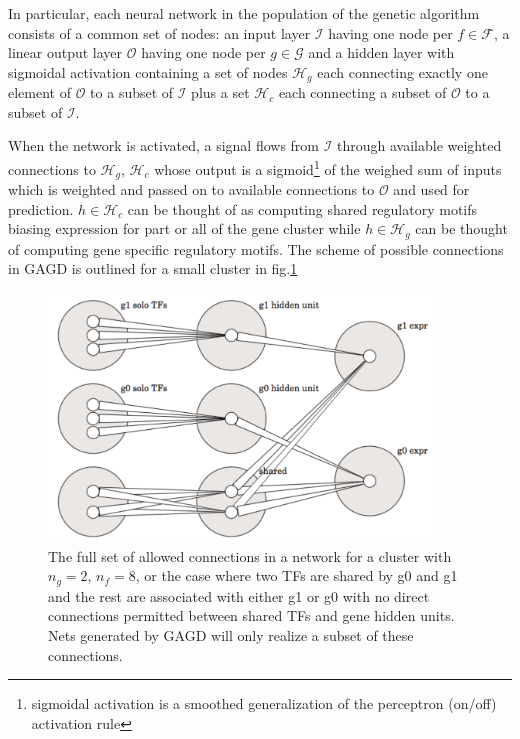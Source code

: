 \documentclass[12pt,a4paper]{article}
\begin{document}
\begin{multicols}{2}
In particular, each neural network in the population of the genetic algorithm  consists of a common set of nodes: an input layer $\mathcal{I}$ having one node per $f \in \mathcal{F}$, a linear output layer $\mathcal{O}$ having one node per $g \in \mathcal{G}$ and a hidden layer with sigmoidal activation containing a set of nodes $\mathcal{H}_g$ each connecting exactly one element of $\mathcal{O}$ to a subset of $\mathcal{I}$ plus a set $\mathcal{H}_c$ each connecting a subset of $\mathcal{O}$ to a subset of $\mathcal{I}$. 

When the network is activated, a signal flows from $\mathcal{I}$ through available weighted connections to $\mathcal{H}_g$, $\mathcal{H}_c$ whose output is a sigmoid\footnote{sigmoidal activation is a smoothed generalization of the perceptron (on/off) activation rule} of the weighed sum of inputs which is weighted and passed on to available connections to $\mathcal{O}$ and used for prediction. $h \in \mathcal{H}_c$ can be thought of as computing shared regulatory motifs biasing expression for part or all of the gene cluster while $h \in \mathcal{H}_g$ can be thought of computing gene specific regulatory motifs. The scheme of possible connections in GAGD is outlined for a small cluster in fig.\ref{fig:gagd}

\begin{figure}[h]
\includegraphics[width = 4in]{figs/gagd_schematic}
\caption{The full set of allowed connections in a network for a cluster with $n_g = 2$, $n_f = 8$, or the case where two TFs are shared by g0 and g1 and the rest are associated with either g1 or g0 with no direct connections permitted between shared TFs and gene hidden units. Nets generated  by GAGD will only realize a subset of these connections.}
\label{fig:gagd}
\end{figure} 


\end{multicols}
\end{document}
